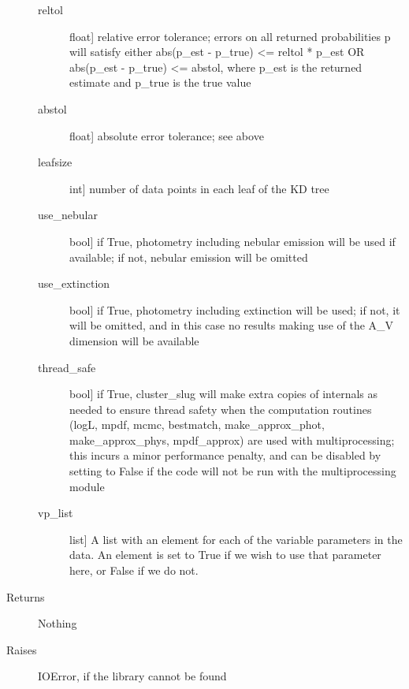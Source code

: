 \documentclass[letterpaper,10pt,english]{sphinxmanual}
\begin{document}
\begin{fulllineitems}
\begin{fulllineitems}
\begin{description}
\begin{description}
\item[{reltol}] \leavevmode{[}float{]}
relative error tolerance; errors on all returned
probabilities p will satisfy either
abs(p\_est - p\_true) \textless{}= reltol * p\_est   OR
abs(p\_est - p\_true) \textless{}= abstol,
where p\_est is the returned estimate and p\_true is the
true value

\item[{abstol}] \leavevmode{[}float{]}
absolute error tolerance; see above

\item[{leafsize}] \leavevmode{[}int{]}
number of data points in each leaf of the KD tree

\item[{use\_nebular}] \leavevmode{[}bool{]}
if True, photometry including nebular emission will be
used if available; if not, nebular emission will be
omitted

\item[{use\_extinction}] \leavevmode{[}bool{]}
if True, photometry including extinction will be used;
if not, it will be omitted, and in this case no results
making use of the A\_V dimension will be available

\item[{thread\_safe}] \leavevmode{[}bool{]}
if True, cluster\_slug will make extra copies of internals
as needed to ensure thread safety when the computation
routines (logL, mpdf, mcmc, bestmatch, make\_approx\_phot,
make\_approx\_phys, mpdf\_approx) are used with
multiprocessing; this incurs a minor performance
penalty, and can be disabled by setting to False if the
code will not be run with the multiprocessing module

\item[{vp\_list}] \leavevmode{[}list{]}
A list with an element for each of the variable parameters
in the data. An element is set to True if we wish to use
that parameter here, or False if we do not.

\end{description}

\item[{Returns}] \leavevmode
Nothing

\item[{Raises}] \leavevmode
IOError, if the library cannot be found

\end{description}

\end{fulllineitems}



\end{fulllineitems}
\end{document}
